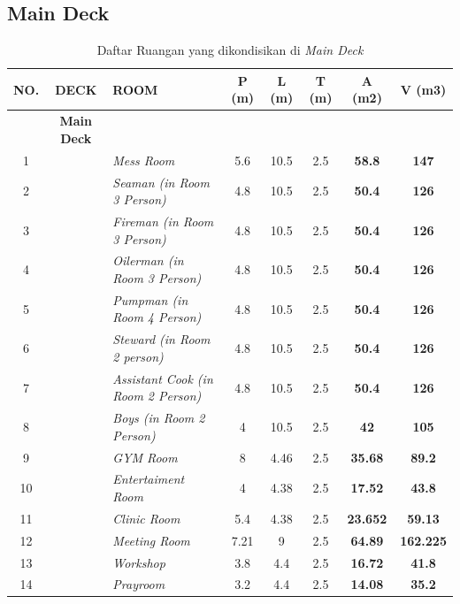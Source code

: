 \documentclass[12pt,a4paper,twoside,openright]{book}
\theoremstyle{definition}
\theoremstyle{plain}
\theoremstyle{remark}
\begin{document}
\subsection*{Main Deck}

\begin{table}[H]
\centering
\caption{Daftar Ruangan yang dikondisikan di \textit{Main Deck}}
\footnotesize
\begin{tabularx}{\textwidth}{|c|c|X|c|c|c|c|c|}
\hline
\rowcolor{tableheader}
\textbf{NO.} & \textbf{DECK} & \textbf{ROOM} & \textbf{P (m)} & \textbf{L (m)} & \textbf{T (m)} & \textbf{A (m2)} & \textbf{V (m3)} \\
\hline
 & \textbf{Main Deck} & & & & & & \\
\hline
1 & & \textit{Mess Room} & 5.6 & 10.5 & 2.5 & \textbf{58.8} & \textbf{147} \\
\hline
2 & & \textit{Seaman (in Room 3 Person)} & 4.8 & 10.5 & 2.5 & \textbf{50.4} & \textbf{126} \\
\hline
3 & & \textit{Fireman (in Room 3 Person)} & 4.8 & 10.5 & 2.5 & \textbf{50.4} & \textbf{126} \\
\hline
4 & & \textit{Oilerman (in Room 3 Person)} & 4.8 & 10.5 & 2.5 & \textbf{50.4} & \textbf{126} \\
\hline
5 & & \textit{Pumpman (in Room 4 Person)} & 4.8 & 10.5 & 2.5 & \textbf{50.4} & \textbf{126} \\
\hline
6 & & \textit{Steward (in Room 2 person)} & 4.8 & 10.5 & 2.5 & \textbf{50.4} & \textbf{126} \\
\hline
7 & & \textit{Assistant Cook (in Room 2 Person)} & 4.8 & 10.5 & 2.5 & \textbf{50.4} & \textbf{126} \\
\hline
8 & & \textit{Boys (in Room 2 Person)} & 4 & 10.5 & 2.5 & \textbf{42} & \textbf{105} \\
\hline
9 & & \textit{GYM Room} & 8 & 4.46 & 2.5 & \textbf{35.68} & \textbf{89.2} \\
\hline
10 & & \textit{Entertaiment Room} & 4 & 4.38 & 2.5 & \textbf{17.52} & \textbf{43.8} \\
\hline
11 & & \textit{Clinic Room} & 5.4 & 4.38 & 2.5 & \textbf{23.652} & \textbf{59.13} \\
\hline
12 & & \textit{Meeting Room} & 7.21 & 9 & 2.5 & \textbf{64.89} & \textbf{162.225} \\
\hline
13 & & \textit{Workshop} & 3.8 & 4.4 & 2.5 & \textbf{16.72} & \textbf{41.8} \\
\hline
14 & & \textit{Prayroom} & 3.2 & 4.4 & 2.5 & \textbf{14.08} & \textbf{35.2} \\
\hline
\end{tabularx}
\end{table}
\end{document}
